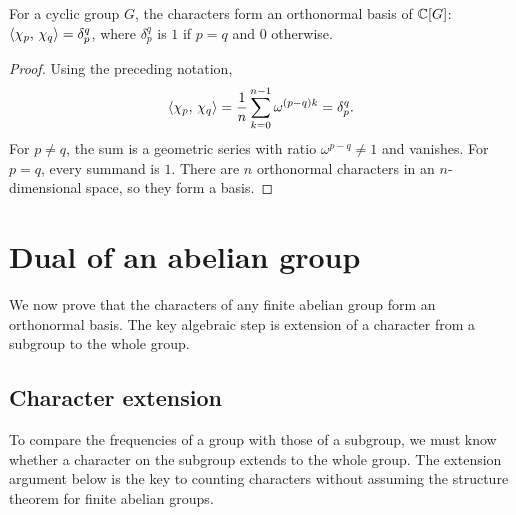 
\begin{prop}
\label{prop-base-ortho-cyclic-case}\label{notation-14}
For a cyclic group $G$, the characters form an orthonormal basis of $\mathbb{C}[G]$:
$\langle \chi_p,\,\chi_q\rangle=\delta_p^q$, where $\delta_p^q$ is $1$ if $p=q$ and $0$
otherwise.
\end{prop}
\begin{proof}
Using the preceding notation,
\begin{equation}
\label{eq-orthogonalite-cyclic-case}
 \langle \chi_p,\,\chi_q\rangle
 =\frac1n\sum_{k=0}^{n-1}\omega^{(p-q)k}=\delta_p^q.
\end{equation}
For $p\neq q$, the sum is a geometric series with ratio
$\omega^{p-q}\neq1$ and vanishes. For $p=q$, every summand is $1$.
There are $n$ orthonormal characters in an $n$-dimensional space, so they form
a basis.
\end{proof}

\section{Dual of an abelian group}
\label{sect1-dual-abelien-group}
We now prove that the characters of any finite abelian group form an
orthonormal basis. The key algebraic step is extension of a character from a
subgroup to the whole group.

\subsection{Character extension}
\label{sec2-approach-algebraic-dual-abelien}

To compare the frequencies of a group with those of a subgroup, we must know
whether a character on the subgroup extends to the whole group. The
extension argument below is the key to counting characters without assuming
the structure theorem for finite abelian groups.

